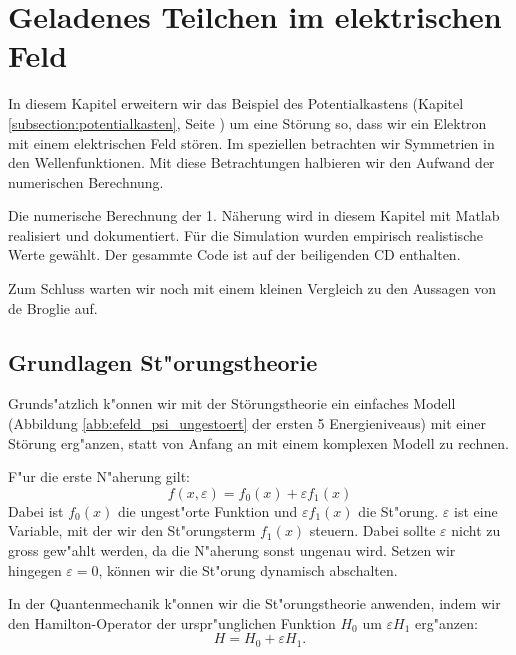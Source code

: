 \chapter{Geladenes Teilchen im elektrischen Feld\label{chapter:efeld}}
\begin{refsection}



In diesem Kapitel erweitern wir das Beispiel des Potentialkastens 
(Kapitel \ref{subsection:potentialkasten}, Seite \pageref{subsection:potentialkasten})
um eine St\"orung so, dass wir ein Elektron mit einem elektrischen Feld st\"oren.
Im speziellen betrachten wir Symmetrien in den Wellenfunktionen.
Mit diese Betrachtungen halbieren wir den Aufwand der numerischen Berechnung.

Die numerische Berechnung der 1. N\"aherung wird in diesem Kapitel mit Matlab realisiert und dokumentiert. 
F\"ur die Simulation wurden empirisch realistische Werte gew\"ahlt.
Der gesammte Code ist auf der beiligenden CD enthalten.

Zum Schluss warten wir noch mit einem kleinen Vergleich zu den Aussagen von de Broglie \cite{efeld:de_Broglie} auf.



\section{Grundlagen St"orungstheorie}
Grunds"atzlich k"onnen wir mit der St\"orungstheorie ein einfaches Modell 
(Abbildung \ref{abb:efeld_psi_ungestoert} der ersten 5 Energieniveaus) 
mit einer St\"orung erg"anzen, statt von Anfang an mit einem komplexen Modell zu rechnen.

F"ur die erste N"aherung gilt:
\[
  f(x, \varepsilon) = f_0(x) + \varepsilon f_1(x)
\]
Dabei ist $f_0(x)$ die ungest"orte Funktion und $\varepsilon f_1(x)$ die St"orung.
$\varepsilon$ ist eine Variable, mit der wir den St"orungsterm $f_1(x)$ steuern.
Dabei sollte $\varepsilon$ nicht zu gross gew"ahlt werden,
da die N"aherung sonst ungenau wird.
Setzen wir hingegen $\varepsilon = 0$, k\"onnen wir die St"orung dynamisch abschalten.




In der Quantenmechanik k"onnen wir die St"orungstheorie anwenden,
indem wir den Hamilton-Operator der urspr"unglichen Funktion $H_0$
um $\varepsilon H_1$ erg"anzen:
\[
  H = H_0 + \varepsilon H_1.
\]


\end{refsection}

